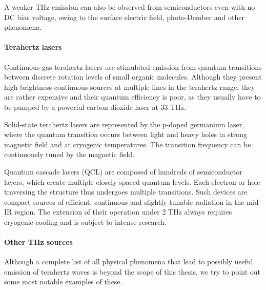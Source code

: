 A weaker THz emission can also be observed from semiconductors even with no DC bias voltage, owing to the surface electric field, photo-Dember and other phenomena.\cite{corchia2001effects, heyman2001terahertz}

\paragraph{Terahertz lasers}%
Continuous gas terahertz lasers use stimulated emission from quantum transitions between discrete rotation levels of small organic molecules.\cite{chang1970cw} Although they present high-brightness continuous sources at multiple lines in the terahertz range, they are rather expensive and their quantum efficiency is poor, as they usually have to be pumped by a powerful carbon dioxide laser at 33 THz.

Solid-state terahertz lasers are represented by the p-doped germanium laser, where the quantum transition occurs between light and heavy holes in strong magnetic field and at cryogenic temperatures. The transition frequency can be continuously tuned by the magnetic field.

Quantum cascade lasers (QCL) are composed of hundreds of semiconductor layers,\cite{yin2012terahertz} which create multiple closely-spaced quantum levels. Each electron or hole traversing the structure thus undergoes multiple transitions. Such devices are compact sources of efficient, continuous and slightly tunable radiation in the mid-IR region. The extension of their operation under 2 THz always requires cryogenic cooling and is subject to intense research.
\paragraph{Other THz sources}%
Although a complete list of all physical phenomena that lead to possibly useful emission of terahertz waves is beyond the scope of this thesis, we try to point out some most notable examples of these. 

